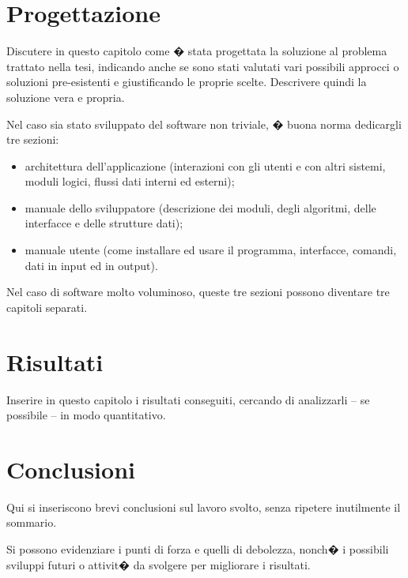 \documentclass[pdfa%
,cucitura%
]{toptesi}
\begin{document}


\chapter{Progettazione}

Discutere in questo capitolo come � stata progettata la soluzione al problema trattato nella tesi, indicando anche se sono stati valutati vari possibili approcci o soluzioni pre-esistenti e giustificando le proprie scelte. Descrivere quindi la soluzione vera e propria.

Nel caso sia stato sviluppato del software non triviale, � buona norma dedicargli tre sezioni:
\begin{itemize}
\item architettura dell'applicazione (interazioni con gli utenti e con altri sistemi, moduli logici, flussi dati interni ed esterni);
\item manuale dello sviluppatore (descrizione dei moduli, degli algoritmi, delle interfacce e delle strutture dati);
\item manuale utente (come installare ed usare il programma, interfacce, comandi, dati in input ed in output).
\end{itemize}
Nel caso di software molto voluminoso, queste tre sezioni possono diventare tre capitoli separati.

\chapter{Risultati}

Inserire in questo capitolo i risultati conseguiti, cercando di analizzarli -- se possibile -- in modo quantitativo.


\chapter{Conclusioni}

Qui si inseriscono brevi conclusioni sul lavoro svolto, senza ripetere inutilmente il sommario.

Si possono evidenziare i punti di forza e quelli di debolezza, nonch� i possibili sviluppi futuri o attivit� da svolgere per migliorare i risultati.

%



\end{document}

